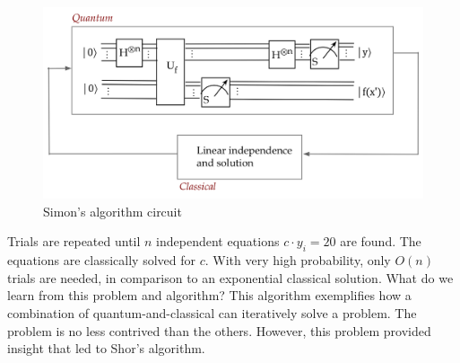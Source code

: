 \documentclass[main.tex]{subfiles}
\begin{document}
    \begin{figure}
        \centering
        \includegraphics[width=5in]{notes/figs/n11/23simon3.png}
            \caption{Simon's algorithm circuit}
        \label{fig:23simon3}
    \end{figure}
    
    Trials are repeated until $n$ independent equations $c \cdot y_{i}=20$ are found. The equations are classically solved for $c$. With very high probability, only $O(n)$ trials are needed, in comparison to an exponential classical solution. What do we learn from this problem and algorithm?   This algorithm exemplifies how a combination of quantum-and-classical can iteratively solve a problem. The problem is no less contrived than the others. However, this problem provided insight that led to Shor's algorithm.
\end{document}
